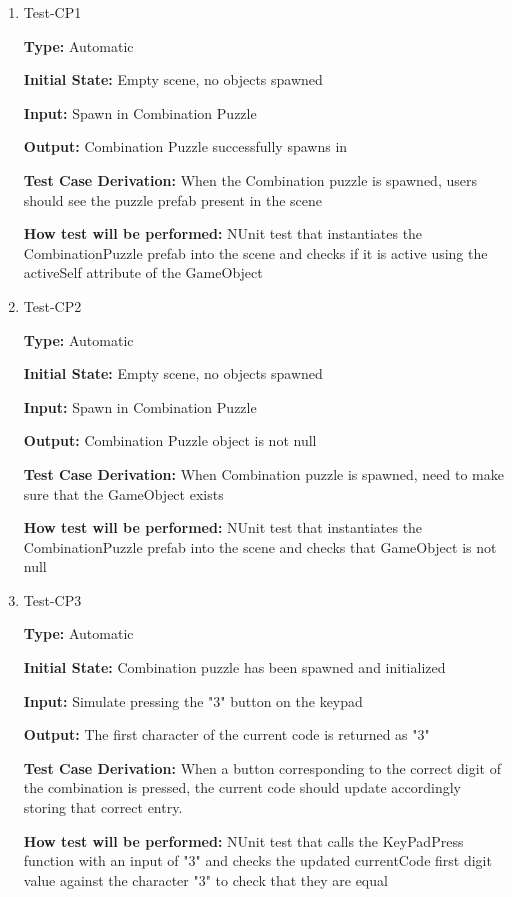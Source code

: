 \documentclass[12pt, titlepage]{article}
\begin{document}
 \begin{enumerate}
 
\item{Test-CP1\\}

\textbf{Type:} Automatic
 
\textbf{Initial State:} Empty scene, no objects spawned

\textbf{Input:} Spawn in Combination Puzzle

\textbf{Output:} Combination Puzzle successfully spawns in

\textbf{Test Case Derivation:} When the Combination puzzle is spawned, users should see the puzzle prefab present in the scene

\textbf{How test will be performed:} NUnit test that instantiates the CombinationPuzzle prefab into the scene and checks if it is active using the activeSelf attribute of the GameObject

\item{Test-CP2\\}

\textbf{Type:} Automatic
 
\textbf{Initial State:} Empty scene, no objects spawned

\textbf{Input:} Spawn in Combination Puzzle

\textbf{Output:} Combination Puzzle object is not null

\textbf{Test Case Derivation:} When Combination puzzle is spawned, need to make sure that the GameObject exists

\textbf{How test will be performed:} NUnit test that instantiates the CombinationPuzzle prefab into the scene and checks that GameObject is not null

\item{Test-CP3\\}

\textbf{Type:} Automatic
 
\textbf{Initial State:} Combination puzzle has been spawned and initialized

\textbf{Input:} Simulate pressing the "3" button on the keypad

\textbf{Output:} The first character of the current code is returned as "3"

\textbf{Test Case Derivation:} When a button corresponding to the correct digit of the combination is pressed, the current code should update accordingly storing that correct entry.

\textbf{How test will be performed:} NUnit test that calls the KeyPadPress function with an input of "3" and checks the updated currentCode first digit value against the character "3" to check that they are equal


\end{enumerate}
\end{document}
